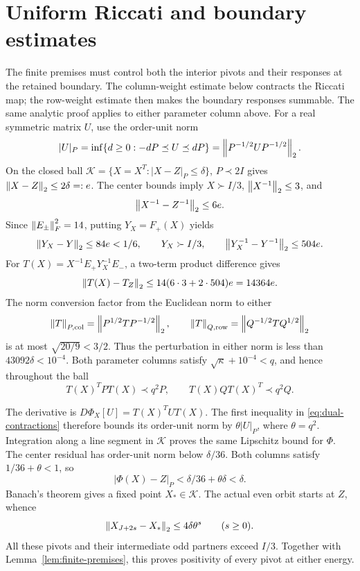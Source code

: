 \section{Uniform Riccati and boundary estimates}
\label{sec:uniform}

The finite premises must control both the interior pivots and their
responses at the retained boundary. The column-weight estimate below
contracts the Riccati map; the row-weight estimate then makes the boundary
responses summable. The same analytic proof applies to either parameter
column above.
For a real symmetric matrix $U$, use the order-unit norm
\[
 |U|_P=\inf\{d\ge0:-dP\preceq U\preceq dP\}
      =\left\lVert P^{-1/2}UP^{-1/2}\right\rVert_2.
\]
On the closed ball $\mathcal K=\{X=X^T:|X-Z|_P\le\delta\}$,
$P\prec2I$ gives $\left\lVert X-Z\right\rVert_2\le2\delta=:e$.
The center bounds imply $X\succ I/3$, $\left\lVert X^{-1}\right\rVert_2\le3$, and
\[
 \left\lVert X^{-1}-Z^{-1}\right\rVert_2\le6e.
\]
Since $\left\lVert E_\pm\right\rVert_F^2=14$, putting $Y_X=F_+(X)$ yields
\[
 \left\lVert Y_X-Y\right\rVert_2\le84e<1/6,\qquad
 Y_X\succ I/3,\qquad
 \left\lVert Y_X^{-1}-Y^{-1}\right\rVert_2\le504e.
\]
For $T(X)=X^{-1}E_+Y_X^{-1}E_-$, a two-term product difference gives
\begin{equation}
 \left\lVert T(X)-T_Z\right\rVert_2\le14(6\cdot3+2\cdot504)e=14364e.
 \label{eq:Tperturb}
\end{equation}
The norm conversion factor from the Euclidean norm to either
\[
 \left\lVert T\right\rVert_{P,\mathrm{col}}=\left\lVert P^{1/2}TP^{-1/2}\right\rVert_2,
 \qquad
 \left\lVert T\right\rVert_{Q,\mathrm{row}}=\left\lVert Q^{-1/2}TQ^{1/2}\right\rVert_2
\]
is at most $\sqrt{20/9}<3/2$. Thus the perturbation in either norm is
less than $43092\delta<10^{-4}$. Both parameter columns satisfy
$\sqrt\kappa+10^{-4}<q$, and hence throughout the ball
\begin{equation}
 T(X)^TPT(X)\prec q^2P,\qquad T(X)QT(X)^T\prec q^2Q.
 \label{eq:dual-contractions}
\end{equation}

The derivative is $D\Phi_X[U]=T(X)^TUT(X)$. The first inequality in
\eqref{eq:dual-contractions} therefore bounds its order-unit norm by
$\theta|U|_P$, where $\theta=q^2$. Integration along a line segment in
$\mathcal K$ proves the same Lipschitz bound for $\Phi$. The center
residual has order-unit norm below $\delta/36$. Both columns satisfy
$1/36+\theta<1$, so
\[
 |\Phi(X)-Z|_P<\delta/36+\theta\delta<\delta.
\]
Banach's theorem gives a fixed point $X_*\in\mathcal K$. The actual
even orbit starts at $Z$, whence
\begin{equation}
 \left\lVert X_{J+2s}-X_*\right\rVert_2\le4\delta\theta^s\qquad(s\ge0).
 \label{eq:pivot-decay}
\end{equation}
All these pivots and their intermediate odd partners exceed $I/3$.
Together with Lemma~\ref{lem:finite-premises}, this proves positivity of
every pivot at either energy.

